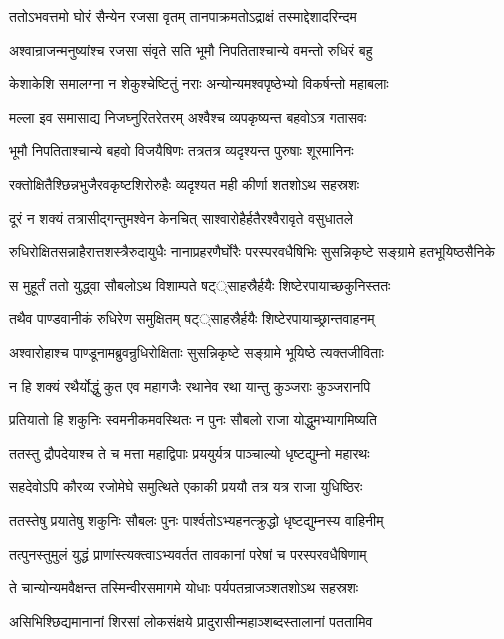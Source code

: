 \twolineshloka
{ततोऽभवत्तमो घोरं सैन्येन रजसा वृतम्}
{तानपाक्रमतोऽद्राक्षं तस्माद्देशादरिन्दम}


\twolineshloka
{अश्वान्राजन्मनुष्यांश्च रजसा संवृते सति}
{भूमौ निपतिताश्चान्ये वमन्तो रुधिरं बहु}


\twolineshloka
{केशाकेशि समालग्ना न शेकुश्चेष्टितुं नराः}
{अन्योन्यमश्वपृष्ठेभ्यो विकर्षन्तो महाबलाः}


\twolineshloka
{मल्ला इव समासाद्य निजघ्नुरितरेतरम्}
{अश्वैश्च व्यपकृष्यन्त बहवोऽत्र गतासवः}


\twolineshloka
{भूमौ निपतिताश्चान्ये बहवो विजयैषिणः}
{तत्रतत्र व्यदृश्यन्त पुरुषाः शूरमानिनः}


\twolineshloka
{रक्तोक्षितैश्छिन्नभुजैरवकृष्टशिरोरुहैः}
{व्यदृश्यत मही कीर्णा शतशोऽथ सहस्रशः}


\twolineshloka
{दूरं न शक्यं तत्रासीद्गन्तुमश्वेन केनचित्}
{साश्वारोहैर्हतैरश्वैरावृते वसुधातले}


\threelineshloka
{रुधिरोक्षितसन्नाहैरात्तशस्त्रैरुदायुधैः}
{नानाप्रहरणैर्घोरैः परस्परवधैषिभिः}
{सुसन्निकृष्टे सङ्ग्रामे हतभूयिष्ठसैनिके}


\twolineshloka
{स मुहूर्तं ततो युद्ध्वा सौबलोऽथ विशाम्पते}
{षट््साहस्रैर्हयैः शिष्टेरपायाच्छकुनिस्ततः}


\twolineshloka
{तथैव पाण्डवानीकं रुधिरेण समुक्षितम्}
{षट््साहस्रैर्हयैः शिष्टेरपायाच्छ्रान्तवाहनम्}


\twolineshloka
{अश्वारोहाश्च पाण्डूनामब्रुवन्रुधिरोक्षिताः}
{सुसन्निकृष्टे सङ्ग्रामे भूयिष्ठे त्यक्तजीविताः}


\twolineshloka
{न हि शक्यं रथैर्योद्धुं कुत एव महागजैः}
{रथानेव रथा यान्तु कुञ्जराः कुञ्जरानपि}


\twolineshloka
{प्रतियातो हि शकुनिः स्वमनीकमवस्थितः}
{न पुनः सौबलो राजा योद्धुमभ्यागमिष्यति}


\twolineshloka
{ततस्तु द्रौपदेयाश्च ते च मत्ता महाद्विपाः}
{प्रययुर्यत्र पाञ्चाल्यो धृष्टद्युम्नो महारथः}


\twolineshloka
{सहदेवोऽपि कौरव्य रजोमेघे समुत्थिते}
{एकाकी प्रययौ तत्र यत्र राजा युधिष्ठिरः}


\twolineshloka
{ततस्तेषु प्रयातेषु शकुनिः सौबलः पुनः}
{पार्श्वतोऽभ्यहनत्क्रुद्धो धृष्टद्युम्नस्य वाहिनीम्}


\twolineshloka
{तत्पुनस्तुमुलं युद्धं प्राणांस्त्यक्त्वाऽभ्यवर्तत}
{तावकानां परेषां च परस्परवधैषिणाम्}


\twolineshloka
{ते चान्योन्यमवैक्षन्त तस्मिन्वीरसमागमे}
{योधाः पर्यपतन्राजञ्शतशोऽथ सहस्रशः}


\twolineshloka
{असिभिश्छिद्यमानानां शिरसां लोकसंक्षये}
{प्रादुरासीन्महाञ्शब्दस्तालानां पततामिव}


